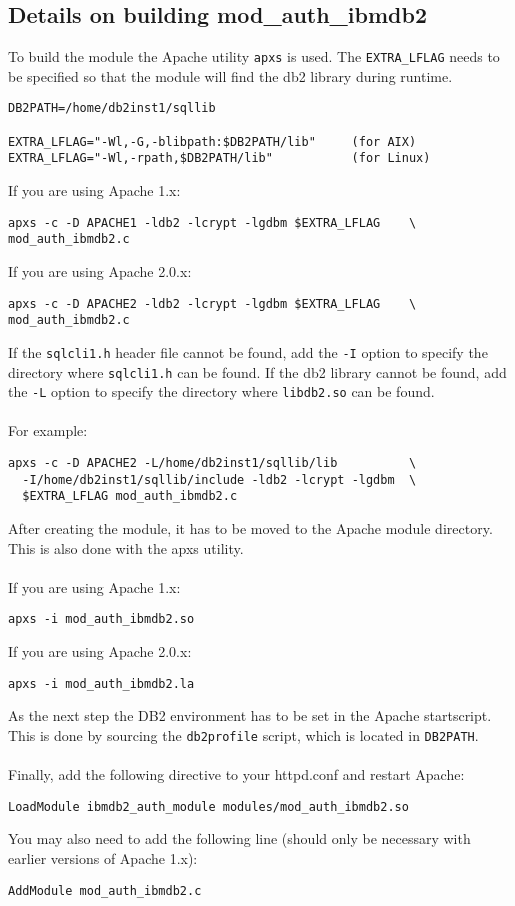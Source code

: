 \documentclass[11pt,a4paper]{article}
\begin{document}
\subsection{Details on building mod\_auth\_ibmdb2}
To build the module the Apache utility {\tt apxs} is used. The {\tt EXTRA\_LFLAG} needs to be specified so that the module will find the db2 library during runtime.
\begin{verbatim}
DB2PATH=/home/db2inst1/sqllib

EXTRA_LFLAG="-Wl,-G,-blibpath:$DB2PATH/lib"     (for AIX)
EXTRA_LFLAG="-Wl,-rpath,$DB2PATH/lib"           (for Linux)
\end{verbatim}
If you are using Apache 1.x:
\begin{verbatim}
apxs -c -D APACHE1 -ldb2 -lcrypt -lgdbm $EXTRA_LFLAG	\
mod_auth_ibmdb2.c
\end{verbatim}
If you are using Apache 2.0.x:
\begin{verbatim}
apxs -c -D APACHE2 -ldb2 -lcrypt -lgdbm $EXTRA_LFLAG	\
mod_auth_ibmdb2.c
\end{verbatim}
If the {\tt sqlcli1.h} header file cannot be found, add the {\tt -I} option to specify the
directory where {\tt sqlcli1.h} can be found.
If the db2 library cannot be found, add the {\tt -L} option to specify the
directory where {\tt libdb2.so} can be found.\\
\\
For example:
\begin{verbatim}
apxs -c -D APACHE2 -L/home/db2inst1/sqllib/lib          \
  -I/home/db2inst1/sqllib/include -ldb2 -lcrypt -lgdbm  \
  $EXTRA_LFLAG mod_auth_ibmdb2.c
\end{verbatim}
After creating the module, it has to be moved to the Apache module directory. This is also done with the apxs utility.\\
\\
If you are using Apache 1.x:
\begin{verbatim}
apxs -i mod_auth_ibmdb2.so
\end{verbatim}
If you are using Apache 2.0.x:
\begin{verbatim}
apxs -i mod_auth_ibmdb2.la
\end{verbatim}
As the next step the DB2 environment has to be set in the Apache startscript. This is done by sourcing the {\tt db2profile} script, which is located in {\tt DB2PATH}.\\
\\
Finally, add the following directive to your httpd.conf and restart Apache:
\begin{verbatim}
LoadModule ibmdb2_auth_module modules/mod_auth_ibmdb2.so
\end{verbatim}
You may also need to add the following line (should only be necessary with earlier versions of Apache 1.x):
\begin{verbatim}
AddModule mod_auth_ibmdb2.c
\end{verbatim}
\end{document}
